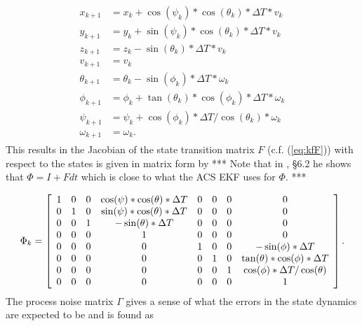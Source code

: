 \begin{align}
\label{eq:kflinearized}
\begin{split}
x_{k+1} &= x_k + \cos(\psi_k)*\cos(\theta_k)*\Delta T*v_k \\
y_{k+1} &= y_k + \sin(\psi_k)*\cos(\theta_k)*\Delta T*v_k \\
z_{k+1} &= z_k - \sin(\theta_k)*\Delta T*v_k \\
v_{k+1} &= v_k \\
\theta_{k+1} &= \theta_k - \sin(\phi_k)*\Delta T*\omega_k \\
\phi_{k+1} &= \phi_k + \tan(\theta_k)*\cos(\phi_k)*\Delta T*\omega_k \\
\psi_{k+1} &= \psi_k + \cos(\phi_k)*\Delta T/\cos(\theta_k)*\omega_k \\
\omega_{k+1} &= \omega_k.
\end{split}
\end{align}
This results in the Jacobian of the state transition matrix $F$ (c.f. (\ref{eq:kfF})) with respect to the states is given in matrix form by *** Note that in \cite{Kelly_1994_338}, \S6.2 he shows that $\Phi = I + Fdt$ which is close to what the ACS EKF uses for $\Phi$. ***

\begin{align*}
\Phi_k = \left[\begin{array}{c c c c c c c c}
1 & 0 & 0 & \cos(\psi)*\cos(\theta)*\Delta T & 0 & 0 & 0 & 0 \\
0 & 1 & 0 & \sin(\psi)*\cos(\theta)*\Delta T & 0 & 0 & 0 & 0\\
0 & 0 & 1 & -\sin(\theta)*\Delta T & 0 & 0 & 0 & 0\\
0 & 0 & 0 & 1 & 0 & 0 & 0 & 0 \\
0 & 0 & 0 & 0 & 1 & 0 & 0 & -\sin(\phi)*\Delta T \\
0 & 0 & 0 & 0 & 0 & 1 & 0 & \tan(\theta)*\cos(\phi)*\Delta T \\
0 & 0 & 0 & 0 & 0 & 0 & 1 & \cos(\phi)*\Delta T/\cos(\theta) \\
0 & 0 & 0 & 0 & 0 & 0 & 0 & 1
\end{array}\right].
\end{align*}
The process noise matrix $\Gamma$ gives a sense of what the errors in the state dynamics are expected to be and is found as

